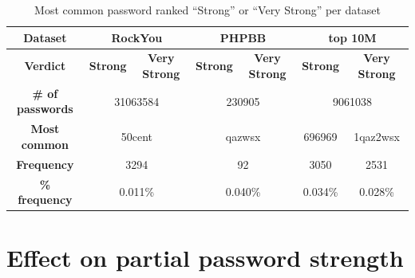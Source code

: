   \begin{table}[htpb]
    \centering
    \small
    \hspace*{-1.5cm}
    \begin{tabular}{|c||c|c|c|c|c|c|}
      \hline
      \textbf{Dataset} & \multicolumn{2}{|c|}{\textbf{RockYou}} & \multicolumn{2}{|c|}{\textbf{PHPBB}} & \multicolumn{2}{|c|}{\textbf{top 10M}} \\
      \hline
      \textbf{Verdict} & \textbf{Strong} & \textbf{Very Strong} & \textbf{Strong} & \textbf{Very Strong} & \textbf{Strong} & \textbf{Very Strong} \\
      \hline
      \textbf{\# of passwords} & \multicolumn{2}{|c|}{31063584} & \multicolumn{2}{|c|}{230905} & \multicolumn{2}{|c|}{9061038} \\ \hline
      \textbf{Most common} & \multicolumn{2}{|c|}{50cent} & \multicolumn{2}{|c|}{qazwsx} & 696969 & 1qaz2wsx \\ \hline
      \textbf{Frequency} & \multicolumn{2}{|c|}{3294} & \multicolumn{2}{|c|}{92} & 3050 & 2531 \\ \hline
      \textbf{\% frequency} & \multicolumn{2}{|c|}{0.011\%} & \multicolumn{2}{|c|}{0.040\%} & 0.034\% & 0.028\% \\ \hline
    \end{tabular}
    \caption{Most common password ranked ``Strong'' or ``Very Strong'' per dataset}
    \label{tab:str_correct}
  \end{table}

\section{Effect on partial password strength}
  \label{sec:useability}

